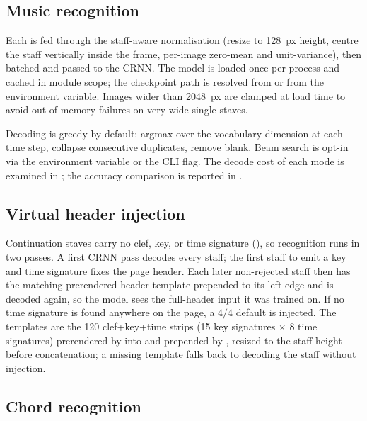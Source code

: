 \subsection{Music recognition}

Each  is fed through the staff-aware normalisation
(resize to \SI{128}{px} height, centre the staff vertically inside the
frame, per-image zero-mean and unit-variance), then batched and passed
to the CRNN.
The model is loaded once per process and cached in module scope; the
checkpoint path is resolved from 
or from the  environment variable.
Images wider than \num{2048}~px are clamped at load time to avoid
out-of-memory failures on very wide single staves.

Decoding is greedy by default: argmax over the vocabulary dimension at
each time step, collapse consecutive duplicates, remove blank.
Beam search is opt-in via the  environment
variable or the  CLI flag.
The decode cost of each mode is examined in
; the accuracy comparison is reported in
.

\subsection{Virtual header injection}

Continuation staves carry no clef, key, or time signature
(), so recognition runs in two passes. A
first CRNN pass decodes every staff; the first staff to emit a key and
time signature fixes the page header. Each later non-rejected staff
then has the matching prerendered header template prepended to its left
edge and is decoded again, so the model sees the full-header input it
was trained on. If no time signature is found anywhere on the page, a
$4/4$ default is injected.
The templates are the 120 clef+key+time strips (15 key signatures
$\times$ 8 time signatures) prerendered by
 into 
and prepended by , resized to the staff
height before concatenation; a missing template falls back to decoding
the staff without injection.

\subsection{Chord recognition}

